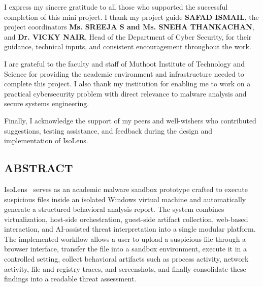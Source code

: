 \documentclass[a4paper,12pt,oneside]{report}
\begin{document}
\noindent
I express my sincere gratitude to all those who supported the successful completion of this mini project. I thank my project guide \textbf{SAFAD ISMAIL}, the project coordinators \textbf{Ms. SREEJA S and Ms. SNEHA THANKACHAN}, and \textbf{Dr. VICKY NAIR}, Head of the Department of Cyber Security, for their guidance, technical inputs, and consistent encouragement throughout the work.

\par

\par

I are grateful to the faculty and staff of Muthoot Institute of Technology and Science for providing the academic environment and infrastructure needed to complete this project. I also thank my institution for enabling me to work on a practical cybersecurity problem with direct relevance to malware analysis and secure systems engineering.

\par

\par

Finally, I acknowledge the support of my peers and well-wishers who contributed suggestions, testing assistance, and feedback during the design and implementation of IsoLens.

\newpage
{}
\setcounter{page}{2}
\thispagestyle{plain}
\begin{center}
\section*{ABSTRACT}
\end{center}
\par

IsoLens~\cite{isolens} serves as an academic malware sandbox prototype crafted to execute suspicious files inside an isolated Windows virtual machine and automatically generate a structured behavioral analysis report. The system combines virtualization, host-side orchestration, guest-side artifact collection, web-based interaction, and AI-assisted threat interpretation into a single modular platform. The implemented workflow allows a user to upload a suspicious file through a browser interface, transfer the file into a sandbox environment, execute it in a controlled setting, collect behavioral artifacts such as process activity, network activity, file and registry traces, and screenshots, and finally consolidate these findings into a readable threat assessment.
\end{document}
